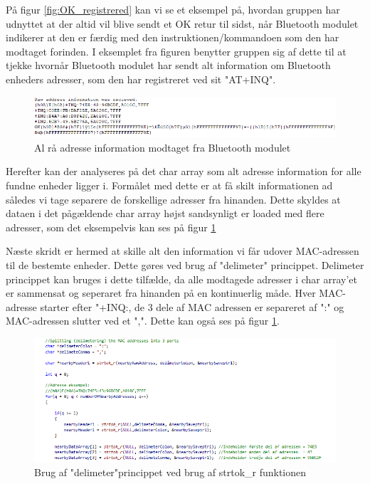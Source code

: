 På figur \ref{fig:OK_registrered} kan vi se et eksempel på, hvordan gruppen har udnyttet at der altid vil blive sendt et OK retur til sidst, når Bluetooth modulet indikerer at den er færdig med den instruktionen/kommandoen som den har modtaget forinden. I eksemplet fra figuren benytter gruppen sig af dette til at tjekke hvornår Bluetooth modulet har sendt alt information om Bluetooth enheders adresser, som den har registreret ved sit "AT+INQ".

\begin{figure}[H]
	\centering
	\includegraphics[width = 500 pt]{Img/raw_address.PNG}
	\caption{Al rå adresse information modtaget fra Bluetooth modulet}
	\label{fig:raw_address}
\end{figure}

Herefter kan der analyseres på det char array som alt adresse information for alle fundne enheder ligger i. Formålet med dette er at få skilt informationen ad således vi tage separere de forskellige adresser fra hinanden. Dette skyldes at dataen i det pågældende char array højst sandsynligt er loaded med flere adresser, som det eksempelvis kan ses på figur \ref{fig:raw_address}

Næste skridt er hermed at skille alt den information vi får udover MAC-adressen til de bestemte enheder. Dette gøres ved brug af "delimeter" princippet. Delimeter princippet kan bruges i dette tilfælde, da alle modtagede adresser i char array'et er sammensat og seperaret fra hinanden på en kontinuerlig måde. Hver MAC-adresse starter efter "+INQ:, de 3 dele af MAC adressen er separeret af ":" og MAC-adressen slutter ved et ",". Dette kan også ses på figur \ref{fig:raw_address}.


\begin{figure}[H]
	\centering
	\includegraphics[width = 500 pt]{Img/delimetering.PNG}
	\caption{Brug af "delimeter"\-princippet ved brug af strtok\_r funktionen}
	\label{fig:delimeter}
\end{figure}

